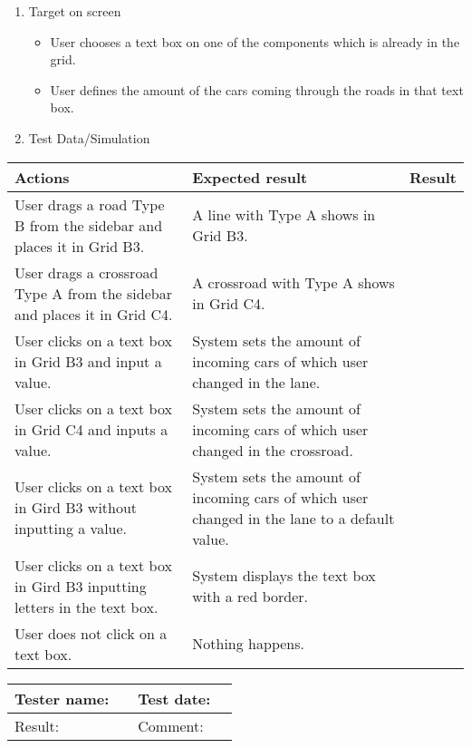 \begin{enumerate}
	
	\item Target on screen
	\begin{itemize}
		\item User chooses a text box on one of the components which is already in the grid.
		\item User defines the amount of the cars coming through the roads in that text box.
	\end{itemize}
	\item Test Data/Simulation
\end{enumerate}	
	\begin{tabularx}{\textwidth}{|X|X|p{2.5cm}|}\hline
		Actions & Expected result & Result \\\hline

		User drags a road Type B from the sidebar and places it in Grid B3. & A line with Type A shows in Grid B3. & \pass \\\hline
		User drags a crossroad Type A from the sidebar and places it in Grid C4. & A crossroad with Type A shows in Grid C4. & \pass \\\hline
		User clicks on a text box in Grid B3 and input a value. & System sets the amount of incoming cars of which user changed in the lane. & \pass \\\hline
		User clicks on a text box in Grid C4 and inputs a value. & System sets the amount of incoming cars of which user changed in the crossroad. & \pass \\\hline
		User clicks on a text box in Gird B3 without inputting a value. & System sets the amount of incoming cars of which user changed in the lane to a default value. & \pass \\\hline
		User clicks on a text box in Gird B3 inputting letters in the text box. & System displays the text box with a red border. & \pass \\\hline
		User does not click on a text box. & Nothing happens. &  \pass \\\hline
	\end{tabularx}
	

\begin{tabularx}{\textwidth}{|p{3cm}X|p{3cm}X|}\hline
	Tester name: &  & Test date: & \\\hline
	Result: &   \pass & Comment: & \\\hline
\end{tabularx}

\newpage 

